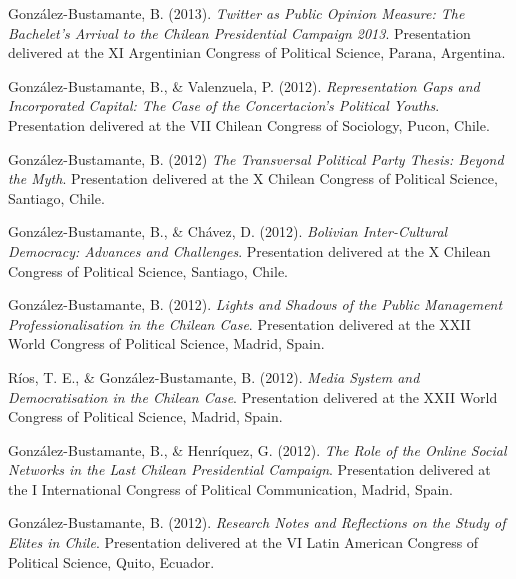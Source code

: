 \begin{publications}
\begin{benumerate}{71}
\item{\small González-Bustamante, B. (2013). {\itshape Twitter as Public Opinion Measure: The Bachelet's Arrival to the Chilean Presidential Campaign 2013}. Presentation delivered at the XI Argentinian Congress of Political Science, Parana, Argentina.}\vspace{1mm}

\item{\small González-Bustamante, B., \& Valenzuela, P. (2012). {\itshape Representation Gaps and Incorporated Capital: The Case of the Concertacion's Political Youths}. Presentation delivered at the VII Chilean Congress of Sociology, Pucon, Chile.}\vspace{1mm}

\item{\small González-Bustamante, B. (2012) {\itshape The Transversal Political Party Thesis: Beyond the Myth}. Presentation delivered at the X Chilean Congress of Political Science, Santiago, Chile.}\vspace{1mm}

\item{\small González-Bustamante, B., \& Chávez, D. (2012). {\itshape Bolivian Inter-Cultural Democracy: Advances and Challenges}. Presentation delivered at the X Chilean Congress of Political Science, Santiago, Chile.}\vspace{1mm}

\item{\small González-Bustamante, B. (2012). {\itshape Lights and Shadows of the Public Management Professionalisation in the Chilean Case}. Presentation delivered at the XXII World Congress of Political Science, Madrid, Spain.}\vspace{1mm}

\item{\small Ríos, T. E., \& González-Bustamante, B. (2012). {\itshape Media System and Democratisation in the Chilean Case}. Presentation delivered at the XXII World Congress of Political Science, Madrid, Spain.}\vspace{1mm}

\item{\small González-Bustamante, B., \& Henríquez, G. (2012). {\itshape The Role of the Online Social Networks in the Last Chilean Presidential Campaign}. Presentation delivered at the I International Congress of Political Communication, Madrid, Spain.}\vspace{1mm}

\item{\small González-Bustamante, B. (2012). {\itshape Research Notes and Reflections on the Study of Elites in Chile}. Presentation delivered at the VI Latin American Congress of Political Science, Quito, Ecuador.}

\end{benumerate}

\end{publications}
